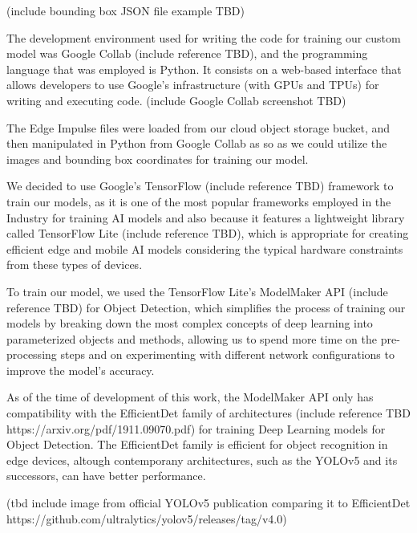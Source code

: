 \documentclass[openright]{normas-utf-tex} %
\begin{document}
(include bounding box JSON file example TBD) 

The development environment used for writing the code for training our custom model
was Google Collab (include reference TBD), and the programming language that was employed is Python. 
It consists on a web-based interface that allows developers
to use Google's infrastructure (with GPUs and TPUs) for writing and executing code.
(include Google Collab screenshot TBD)

The Edge Impulse files were loaded from our cloud object storage bucket, and then manipulated in Python
from Google Collab as so as we could utilize the images and bounding box coordinates for training
our model.

We decided to use Google's TensorFlow (include reference TBD) framework to train our models, 
as it is one of the most popular frameworks employed in the Industry for training AI models
and also because it features a lightweight library called TensorFlow Lite (include reference TBD), 
which is appropriate for creating efficient edge and mobile AI models considering the 
typical hardware constraints from these types of devices.

To train our model, we used the TensorFlow Lite's ModelMaker API (include reference TBD) for 
Object Detection, which simplifies the process of training our models by breaking down the most
complex concepts of deep learning into parameterized objects and methods, allowing us to spend
more time on the pre-processing steps and on experimenting with different network configurations
to improve the model's accuracy. 

As of the time of development of this work, the ModelMaker API only has compatibility with the 
EfficientDet family of architectures (include reference TBD https://arxiv.org/pdf/1911.09070.pdf)
for training Deep Learning models for Object Detection. 
The EfficientDet family is efficient for object recognition in edge devices, altough contemporany 
architectures, such as the YOLOv5 and its successors, can have better performance.

(tbd include image from official YOLOv5 publication comparing it to EfficientDet https://github.com/ultralytics/yolov5/releases/tag/v4.0)
\end{document}
